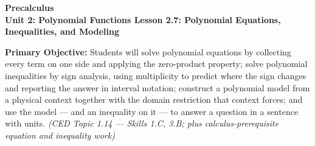 \documentclass[10pt]{article}
\newcommand{\CourseName}{Precalculus}
\newcommand{\UnitNumberName}{Unit 2: Polynomial Functions \quad}
\newcommand{\LessonNumberName}{Lesson 2.7: Polynomial Equations, Inequalities, and Modeling}
\begin{document}
\begin{center}
    {\Large\bfseries \CourseName \\
    {\small\bfseries \UnitNumberName \LessonNumberName}}
\end{center}

\begin{tcolorbox}[colback=lilac, colframe=plum, boxrule=0.9pt, arc=2mm,
    left=2mm, right=2mm, top=1.5mm, bottom=1.5mm]
    \textbf{Primary Objective:} Students will solve polynomial equations by
    collecting every term on one side and applying the zero-product property;
    solve polynomial inequalities by sign analysis, using multiplicity to
    predict where the sign changes and reporting the answer in interval
    notation; construct a polynomial model from a physical context together
    with the domain restriction that context forces; and use the model --- and
    an inequality on it --- to answer a question in a sentence with units.
    \hfill\textit{\small (CED Topic 1.14 --- Skills 1.C, 3.B; plus
    calculus-prerequisite equation and inequality work)}
\end{tcolorbox}
\end{document}
